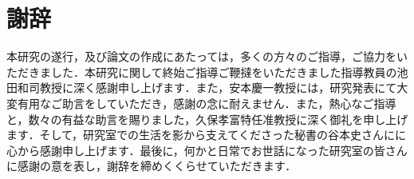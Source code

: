 \chapter*{謝辞}
本研究の遂行，及び論文の作成にあたっては，多くの方々のご指導，ご協力をいただきました．本研究に関して終始ご指導ご鞭撻をいただきました指導教員の池田和司教授に深く感謝申し上げます．また，安本慶一教授には，研究発表にて大変有用なご助言をしていただき，感謝の念に耐えません．また，熱心なご指導と，数々の有益な助言を賜りました，久保孝富特任准教授に深く御礼を申し上げます．そして，研究室での生活を影から支えてくださった秘書の谷本史さんにに心から感謝申し上げます．最後に，何かと日常でお世話になった研究室の皆さんに感謝の意を表し，謝辞を締めくくらせていただきます．
